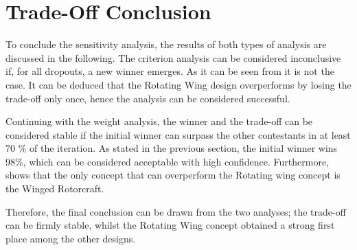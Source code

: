 \section{Trade-Off Conclusion}
\label{sec:TradeOffConlusion}
To conclude the sensitivity analysis, the results of both types of analysis are discussed in the following.
The criterion analysis can be considered inconclusive if, for all dropouts, a new winner emerges.
As it can be seen from  it is not the case.
It can be deduced that the Rotating Wing design overperforms by losing the trade-off only once, hence the analysis can be considered successful.

Continuing with the weight analysis,
the winner and the trade-off can be considered stable
if the initial winner can surpass the other contestants in at least 70 \% of the iteration.
As stated in the previous section, the initial winner wins 98\%,
which can be considered acceptable with high confidence.
Furthermore, 
shows that the only concept that can overperform the Rotating wing concept is the Winged Rotorcraft.

Therefore, the final conclusion can be drawn from the two analyses; the trade-off can be firmly stable, whilst the Rotating Wing concept obtained a strong first place among the other designs.
